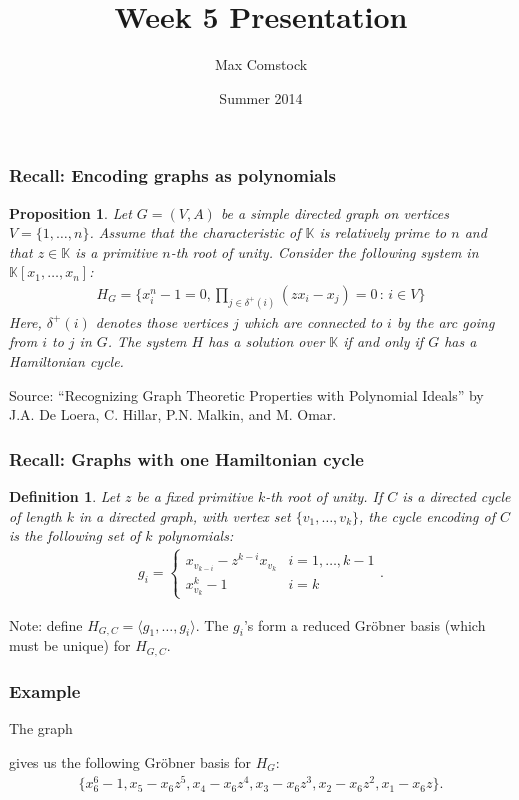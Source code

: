\documentclass{beamer}
\title{Week 5 Presentation}
\author{Max Comstock}
\date{Summer 2014}
\newtheorem*{prop}{Proposition}
\newtheorem*{defin}{Definition}
\begin{document}
\frame{\titlepage}

\begin{frame}
\frametitle{Recall: Encoding graphs as polynomials}
\begin{prop}
  Let $G = (V,A)$ be a simple directed graph on vertices $V = \{1, \ldots, n\}$. Assume that the characteristic of $\mathbb{K}$ is relatively prime to $n$ and that $z \in \mathbb{K}$ is a primitive $n$-th root of unity. Consider the following system in $\mathbb{K}[x_1, \ldots, x_n]$:
  \begin{align*}
    H_G = \{x_i^n - 1 = 0, \prod_{j \in \delta^+(i)} (z x_i - x_j) = 0 \, : \, i \in V\}
  \end{align*}
  Here, $\delta^+(i)$ denotes those vertices $j$ which are connected to $i$ by the arc going from $i$ to $j$ in $G$. The system $H$ has a solution over $\mathbb{K}$ if and only if $G$ has a Hamiltonian cycle.
\end{prop}
Source: ``Recognizing Graph Theoretic Properties with Polynomial Ideals'' by J.A. De Loera, C. Hillar, P.N. Malkin, and M. Omar.
\end{frame}

\begin{frame}
\frametitle{Recall: Graphs with one Hamiltonian cycle}
\begin{defin}
  Let $z$ be a fixed primitive $k$-th root of unity. If $C$ is a directed cycle of length $k$ in a directed graph, with vertex set $\{v_1, \ldots, v_k\}$, the cycle encoding of $C$ is the following set of $k$ polynomials:
  \begin{align*}
    g_i = \left \{ \begin{matrix} x_{v_{k-i}} - z^{k-i} x_{v_k} & i = 1, \ldots, k-1\\ x_{v_k}^k - 1 & i = k \end{matrix} \right ..
  \end{align*}
\end{defin}
Note: define $H_{G,C} = \langle g_1, \ldots, g_i \rangle$. The $g_i$'s form a reduced Gr\"obner basis (which must be unique) for $H_{G,C}$.
\end{frame}

\begin{frame}
\frametitle{Example}
The graph
\begin{center}
\end{center}
gives us the following Gr\"obner basis for $H_G$:
\begin{align*}
	\{x_6^6-1, x_5-x_6z^5, x_4-x_6z^4, x_3-x_6z^3, x_2-x_6z^2, x_1-x_6z\}.
\end{align*}
\end{frame}
\end{document}
